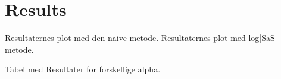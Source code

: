 \chapter{Results}
Resultaternes plot med den naive metode.
Resultaternes plot med log|SaS| metode.

Tabel med Resultater for forskellige alpha.

